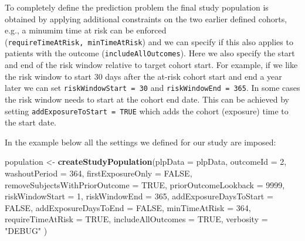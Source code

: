 \documentclass[11pt]{book}
\newenvironment{Shaded}{\begin{snugshade}}{\end{snugshade}}
\newcommand{\KeywordTok}[1]{\textcolor[rgb]{0.13,0.29,0.53}{\textbf{#1}}}
\newcommand{\DataTypeTok}[1]{\textcolor[rgb]{0.13,0.29,0.53}{#1}}
\newcommand{\DecValTok}[1]{\textcolor[rgb]{0.00,0.00,0.81}{#1}}
\newcommand{\StringTok}[1]{\textcolor[rgb]{0.31,0.60,0.02}{#1}}
\newcommand{\OtherTok}[1]{\textcolor[rgb]{0.56,0.35,0.01}{#1}}
\newcommand{\NormalTok}[1]{#1}
\begin{document}
To completely define the prediction problem the final study population
is obtained by applying additional constraints on the two earlier
defined cohorts, e.g., a minumim time at risk can be enforced
(\texttt{requireTimeAtRisk,\ minTimeAtRisk}) and we can specify if this
also applies to patients with the outcome (\texttt{includeAllOutcomes}).
Here we also specify the start and end of the risk window relative to
target cohort start. For example, if we like the risk window to start 30
days after the at-risk cohort start and end a year later we can set
\texttt{riskWindowStart\ =\ 30} and \texttt{riskWindowEnd\ =\ 365}. In
some cases the risk window needs to start at the cohort end date. This
can be achieved by setting \texttt{addExposureToStart\ =\ TRUE} which
adds the cohort (exposure) time to the start date.

In the example below all the settings we defined for our study are
imposed:

\begin{Shaded}
\begin{Highlighting}[]
\NormalTok{population <-}\StringTok{ }\KeywordTok{createStudyPopulation}\NormalTok{(}\DataTypeTok{plpData =}\NormalTok{ plpData,}
                                    \DataTypeTok{outcomeId =} \DecValTok{2}\NormalTok{,}
                                    \DataTypeTok{washoutPeriod =} \DecValTok{364}\NormalTok{,}
                                    \DataTypeTok{firstExposureOnly =} \OtherTok{FALSE}\NormalTok{,}
                                    \DataTypeTok{removeSubjectsWithPriorOutcome =} \OtherTok{TRUE}\NormalTok{,}
                                    \DataTypeTok{priorOutcomeLookback =} \DecValTok{9999}\NormalTok{,}
                                    \DataTypeTok{riskWindowStart =} \DecValTok{1}\NormalTok{,}
                                    \DataTypeTok{riskWindowEnd =} \DecValTok{365}\NormalTok{,}
                                    \DataTypeTok{addExposureDaysToStart =} \OtherTok{FALSE}\NormalTok{,}
                                    \DataTypeTok{addExposureDaysToEnd =} \OtherTok{FALSE}\NormalTok{,}
                                    \DataTypeTok{minTimeAtRisk =} \DecValTok{364}\NormalTok{,}
                                    \DataTypeTok{requireTimeAtRisk =} \OtherTok{TRUE}\NormalTok{,}
                                    \DataTypeTok{includeAllOutcomes =} \OtherTok{TRUE}\NormalTok{,}
                                    \DataTypeTok{verbosity =} \StringTok{"DEBUG"}
\NormalTok{)}
\end{Highlighting}
\end{Shaded}
\end{document}
